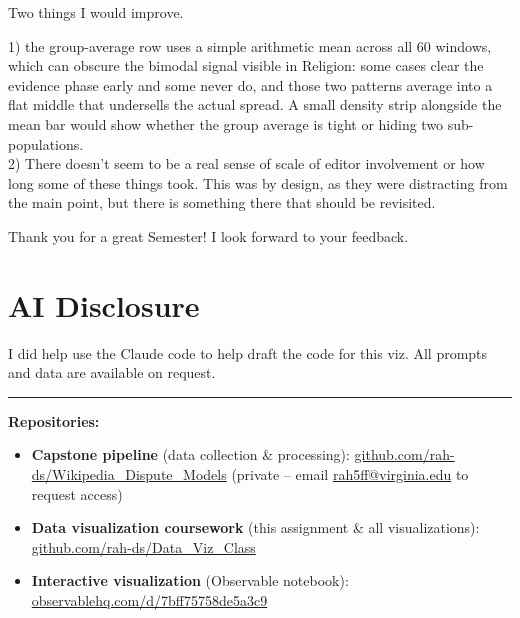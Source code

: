 \documentclass[a4paper, 11pt]{article}
\begin{document}
Two things I would improve.

1) the group-average row uses a simple arithmetic mean across all 60
windows, which can obscure the bimodal signal visible in Religion: some cases
clear the evidence phase early and some never do, and those two patterns
average into a flat middle that undersells the actual spread.
A small density strip alongside the mean bar would show whether the group
average is tight or hiding two sub-populations.\\

2) There doesn't seem to be a real sense of scale of editor involvement or how long some of these things took. This was by design, as they were distracting from the main point, but there is something there that should be revisited.

Thank you for a great Semester! I look forward to your feedback.


\section{AI Disclosure}
I did help use the Claude code to help draft the code for this viz. All prompts and data are available on request.


\bigskip
{\sloppy\noindent\textcolor{ev}{\rule{\linewidth}{0.4pt}}
\smallskip
\noindent\small\textbf{Repositories:}
\begin{itemize}
  \itemsep0pt
  \item \textbf{Capstone pipeline} (data collection \& processing):
    \href{https://github.com/rah-ds/Wikipedia_Dispute_Models}%
         {github.com/rah-ds/Wikipedia\_Dispute\_Models}
    (private -- email \href{mailto:rah5ff@virginia.edu}{rah5ff@virginia.edu} to request access)
  \item \textbf{Data visualization coursework} (this assignment \& all visualizations):
    \href{https://github.com/rah-ds/Data_Viz_Class}%
         {github.com/rah-ds/Data\_Viz\_Class}
  \item \textbf{Interactive visualization} (Observable notebook):
    \href{https://observablehq.com/d/7bff75758de5a3c9}%
         {observablehq.com/d/7bff75758de5a3c9}
\end{itemize}}
\end{document}

